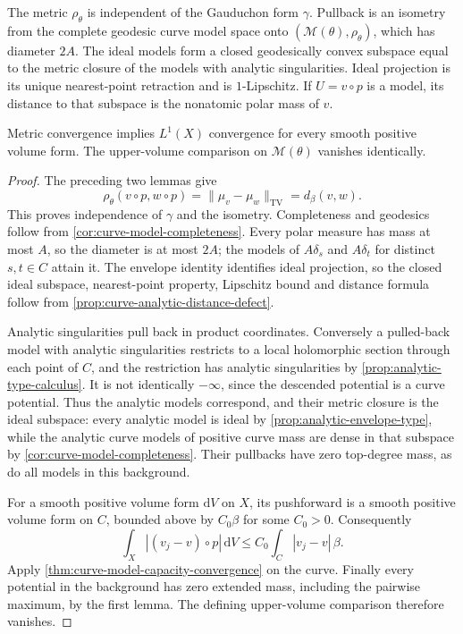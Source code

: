 \begin{proposition}\label{fibration:polar-model-metric}
The metric $\rho_\theta$ is independent of the Gauduchon form
$\gamma$. Pullback is an isometry from the complete geodesic
curve model space onto $(\mathcal M(\theta),\rho_\theta)$, which
has diameter $2A$. The ideal models form a closed geodesically
convex subspace equal to the metric closure of the models with
analytic singularities. Ideal projection is its unique
nearest-point retraction and is $1$-Lipschitz. If $U=v\circ p$ is
a model, its distance to that subspace is the nonatomic polar
mass of $v$.

Metric convergence implies $L^1(X)$ convergence for every smooth
positive volume form. The upper-volume comparison on
$\mathcal M(\theta)$ vanishes identically.
\end{proposition}
\begin{proof}
The preceding two lemmas give
\[
 \rho_\theta(v\circ p,w\circ p)
       =\|\mu_v-\mu_w\|_{\mathrm{TV}}
       =d_\beta(v,w).
\]
This proves independence of $\gamma$ and the isometry.
Completeness and geodesics follow from
\cref{cor:curve-model-completeness}. Every polar measure has mass
at most $A$, so the diameter is at most $2A$; the models of
$A\delta_s$ and $A\delta_t$ for distinct $s,t\in C$ attain it.
The envelope identity identifies ideal projection, so the closed
ideal subspace, nearest-point property, Lipschitz bound and
distance formula follow from \cref{prop:curve-analytic-distance-defect}.

Analytic singularities pull back in product coordinates.
Conversely a pulled-back model with analytic singularities
restricts to a local holomorphic section through each point of
$C$, and the restriction has analytic singularities by
\cref{prop:analytic-type-calculus}. It is not identically
$-\infty$, since the descended potential is a curve potential.
Thus the analytic models correspond, and their metric closure
is the ideal subspace: every analytic model is ideal by
\cref{prop:analytic-envelope-type}, while the analytic curve
models of positive curve mass are dense in that subspace by
\cref{cor:curve-model-completeness}. Their pullbacks have zero
top-degree mass, as do all models in this background.

For a smooth positive volume form $\mathrm dV$ on $X$, its
pushforward is a smooth positive volume form on $C$, bounded
above by $C_0\beta$ for some $C_0>0$. Consequently
\[
 \int_X|(v_j-v)\circ p|\,\mathrm dV
      \leq C_0\int_C|v_j-v|\,\beta.
\]
Apply \cref{thm:curve-model-capacity-convergence} on the curve.
Finally every potential in the background has zero extended
mass, including the pairwise maximum, by the first lemma.
The defining upper-volume comparison therefore vanishes.
\end{proof}

